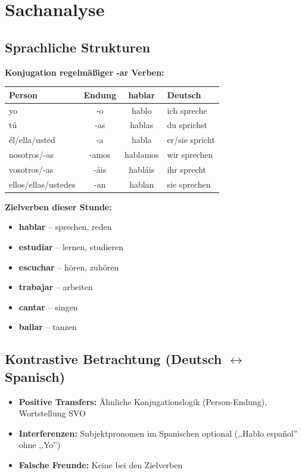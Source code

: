 \documentclass[11pt,a4paper]{article}
\begin{document}
\section{Sachanalyse}

\subsection{Sprachliche Strukturen}

\textbf{Konjugation regelmäßiger -ar Verben:}

\begin{center}
\begin{tabular}{|l|c|c|l|}
\hline
\textbf{Person} & \textbf{Endung} & \textbf{hablar} & \textbf{Deutsch} \\
\hline
yo & -o & hablo & ich spreche \\
tú & -as & hablas & du sprichst \\
él/ella/usted & -a & habla & er/sie spricht \\
nosotros/-as & -amos & hablamos & wir sprechen \\
vosotros/-as & -áis & habláis & ihr sprecht \\
ellos/ellas/ustedes & -an & hablan & sie sprechen \\
\hline
\end{tabular}
\end{center}

\textbf{Zielverben dieser Stunde:}
\begin{itemize}
    \item \textbf{hablar} -- sprechen, reden
    \item \textbf{estudiar} -- lernen, studieren
    \item \textbf{escuchar} -- hören, zuhören
    \item \textbf{trabajar} -- arbeiten
    \item \textbf{cantar} -- singen
    \item \textbf{bailar} -- tanzen
\end{itemize}

\subsection{Kontrastive Betrachtung (Deutsch $\leftrightarrow$ Spanisch)}
\begin{itemize}
    \item \textbf{Positive Transfers:} Ähnliche Konjugationslogik (Person-Endung), Wortstellung SVO
    \item \textbf{Interferenzen:} Subjektpronomen im Spanischen optional (,,Hablo español'' ohne ,,Yo'')
    \item \textbf{Falsche Freunde:} Keine bei den Zielverben
\end{itemize}
\end{document}
